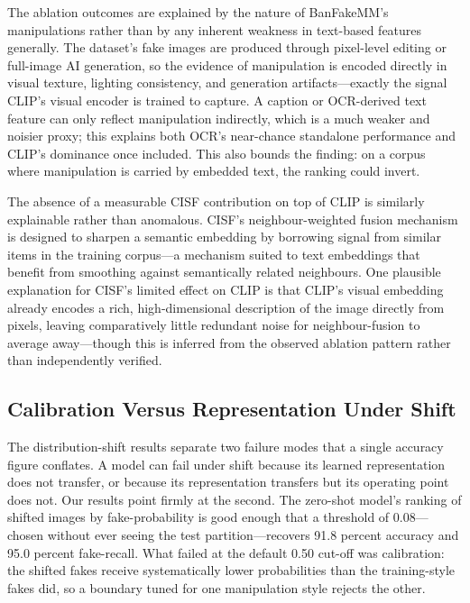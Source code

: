 \documentclass[conference,a4paper]{IEEEtran}
\begin{document}
The ablation outcomes are explained by the nature of BanFakeMM's manipulations
rather than by any inherent weakness in text-based features generally. The
dataset's fake images are produced through pixel-level editing or full-image
AI generation, so the evidence of manipulation is encoded directly in visual
texture, lighting consistency, and generation artifacts---exactly the signal
CLIP's visual encoder is trained to capture. A caption or OCR-derived text
feature can only reflect manipulation indirectly, which is a much weaker and
noisier proxy; this explains both OCR's near-chance standalone performance and
CLIP's dominance once included. This also bounds the finding: on a corpus
where manipulation is carried by embedded text, the ranking could invert.

The absence of a measurable CISF contribution on top of CLIP is similarly
explainable rather than anomalous. CISF's neighbour-weighted fusion mechanism
is designed to sharpen a semantic embedding by borrowing signal from similar
items in the training corpus---a mechanism suited to text embeddings that
benefit from smoothing against semantically related neighbours. One plausible
explanation for CISF's limited effect on CLIP is that CLIP's visual embedding
already encodes a rich, high-dimensional description of the image directly
from pixels, leaving comparatively little redundant noise for neighbour-fusion
to average away---though this is inferred from the observed ablation pattern
rather than independently verified.

\subsection{Calibration Versus Representation Under Shift}

The distribution-shift results separate two failure modes that a single
accuracy figure conflates. A model can fail under shift because its learned
representation does not transfer, or because its representation transfers but
its operating point does not. Our results point firmly at the second. The
zero-shot model's ranking of shifted images by fake-probability is good enough
that a threshold of 0.08---chosen without ever seeing the test
partition---recovers 91.8 percent accuracy and 95.0 percent fake-recall.
What failed at the default 0.50 cut-off was calibration: the shifted fakes
receive systematically lower probabilities than the training-style fakes did,
so a boundary tuned for one manipulation style rejects the other.
\end{document}
